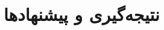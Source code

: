 \documentclass[a4paper,fleqn]{report}
\begin{document}








\chapter{نتیجه‌گیری و پیشنهادها}
\label{chap:conclusion}
\end{document}
